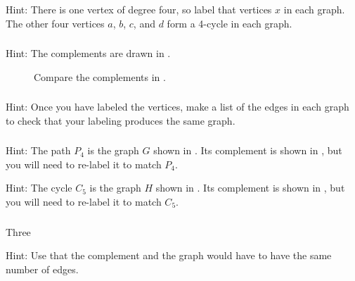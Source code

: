 \subsubsection*{ \answers}
    Hint: There is one vertex of degree four, so label that vertices $x$ in each graph.  The other four vertices $a$, $b$, $c$, and $d$ form a 4-cycle in each graph.

\subsubsection*{ \answers}
    Hint: The complements are drawn in .

            \begin{figure}[hbtp]
            \centering
            
            \caption{Compare the complements in .}
            \label{fig_ism_H4b7_comp}
        \end{figure}

\subsubsection*{ \answers}
    Hint: Once you have labeled the vertices, make a list of the edges in each graph to check that your labeling produces the same graph.

\subsubsection*{ \answers}
\begin{apart}
    \item Hint: The path $P_4$ is the graph $G$ shown in .  Its complement is shown in , but you will need to re-label it to match $P_4$.
    \item Hint: The cycle $C_5$ is the graph $H$ shown in .  Its complement is shown in , but you will need to re-label it to match $C_5$.
\end{apart}

\subsubsection*{ \answers}
\begin{apart}
    \item Three
    \item Hint: Use that the complement and the graph would have to have the same number of edges.
\end{apart}

